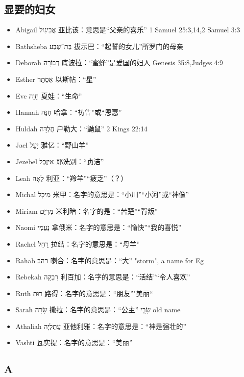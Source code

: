 \subsection{显要的妇女}
\begin{itemize}
\itemsep-.45em
\item Abigail אֲבִיגַיִל 亚比该：意思是“父亲的喜乐” 1 Samuel 25:3,14,2 Samuel 3:3
\item Bathsheba בַּת־שֶׁבַע 拔示巴：“起誓的女儿”所罗门的母亲
\item Deborah דְּבּוֹרָה 底波拉：“蜜蜂”是爱国的妇人 Genesis 35:8,Judges 4:9
\item Esther אֶסְתֵּר 以斯帖：“星”
\item Eve חַוָּה 夏娃：“生命”
\item Hannah חַנָּה 哈拿：“祷告”或“恩惠”
\item Huldah חֻלְדָּה 户勒大：“鼬鼠” 2 Kings 22:14
\item Jael יָעֵל 雅亿：“野山羊”
\item Jezebel אִיזֶבֶל 耶洗别：“贞洁”
\item Leah לֵאָה 利亚：“羚羊”“疲乏”（？）
\item Michal מִיכָל 米甲：名字的意思是：“小川”“小河”或“神像”
\item Miriam מִרְיָם 米利暗：名字的是：“苦楚”“背叛”
\item Naomi נָעֱמִי 拿俄米：名字的意思是：“愉快”“我的喜悦”
\item Rachel רָחֵל 拉结：名字的意思是：“母羊”
\item Rahab רַהַב  喇合：名字的意思是：“大” "storm", a name for Eg
\item Rebekah רִבְקָה 利百加：名字的意思是：“活结”“令人喜欢”
\item Ruth רוּת 路得：名字的意思是：“朋友”"美丽“
\item Sarah שָׂרָה 撒拉：名字的意思是：“公主”  שָׂרָ֑י old name
\item Athaliah עֲתַלְיָה 亚他利雅：名字的意思是：“神是强壮的”
\item Vashti  瓦实提：名字的意思是：“美丽”
\end{itemize}






\subsection{A}
 
